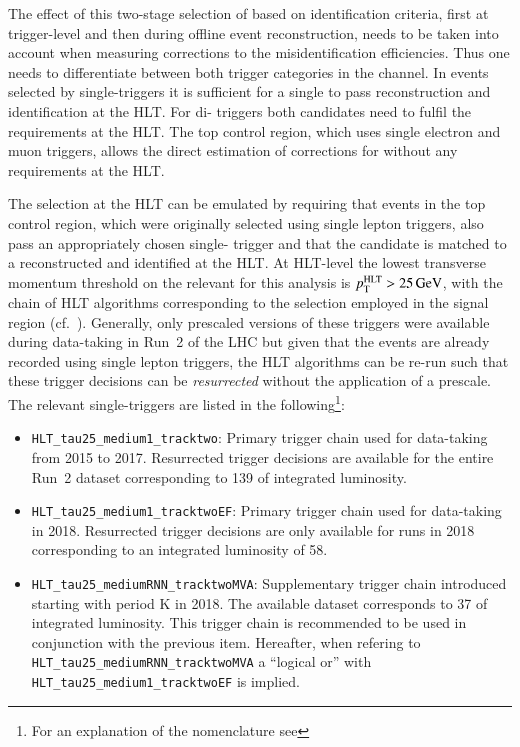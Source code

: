 The effect of this two-stage selection of \tauhadvis based on
identification criteria, first at trigger-level and then during
offline event reconstruction, needs to be taken into account when
measuring corrections to the \tauhadvis misidentification
efficiencies. Thus one needs to differentiate between both trigger
categories in the \hadhad channel. In events selected by
single-\tauhadvis triggers it is sufficient for a single \tauhadvis to
pass reconstruction and identification at the HLT. For di-\tauhadvis
triggers both candidates need to fulfil the requirements at the HLT.
The top control region, which uses single electron and muon triggers,
allows the direct estimation of corrections for \tauhadvis without any
requirements at the HLT.

The selection at the HLT can be emulated by requiring that events in
the top control region, which were originally selected using single
lepton triggers, also pass an appropriately chosen single-\tauhadvis
trigger and that the \tauhadvis candidate is matched to a
reconstructed and identified \tauhadvis at the HLT. At HLT-level the
lowest transverse momentum threshold on the \tauhadvis relevant for
this analysis is $p_{\text{T}}^{\text{HLT}} > \SI{25}{\ensuremath{\text{GeV}}}$, with the chain of HLT
algorithms corresponding to the selection employed in the \hadhad
signal region (cf.\ ). Generally, only prescaled
versions of these triggers were available during data-taking in Run~2
of the LHC but given that the events are already recorded using single
lepton triggers, the HLT algorithms can be re-run such that these
trigger decisions can be \textit{resurrected} without the application
of a prescale. The relevant single-\tauhadvis triggers are listed in
the following\footnote{For an explanation of the nomenclature see
  }:
\begin{itemize}

\item \verb|HLT_tau25_medium1_tracktwo|: Primary trigger chain used
  for data-taking from 2015 to 2017. Resurrected trigger decisions are
  available for the entire Run~2 dataset corresponding to
  \SI{139}{\ifb} of integrated luminosity.

\item \verb|HLT_tau25_medium1_tracktwoEF|: Primary trigger chain used
  for data-taking in 2018. Resurrected trigger decisions are only
  available for runs in 2018 corresponding to an integrated luminosity
  of \SI{58}{\ifb}.

\item \verb|HLT_tau25_mediumRNN_tracktwoMVA|: Supplementary trigger
  chain introduced starting with period K in 2018. The available
  dataset corresponds to \SI{37}{\ifb} of integrated luminosity.  This
  trigger chain is recommended to be used in conjunction with the
  previous item. Hereafter, when refering to
  \verb|HLT_tau25_mediumRNN_tracktwoMVA| a ``logical or'' with
  \verb|HLT_tau25_medium1_tracktwoEF| is implied.

\end{itemize}

